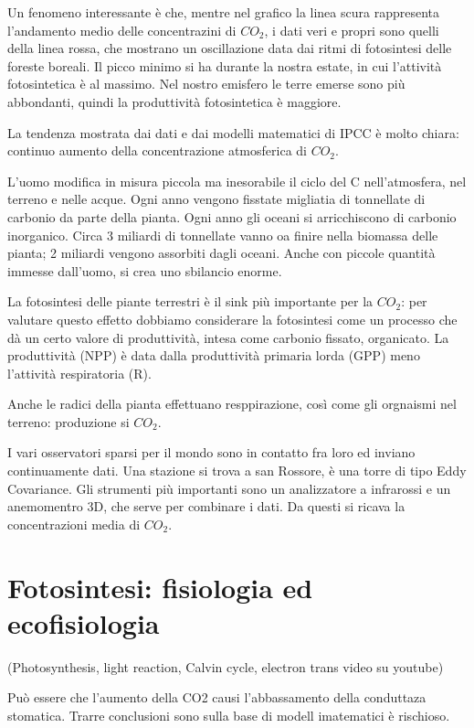 \documentclass[a4paper,12pt]{book}
\begin{document}
Un fenomeno interessante è che, mentre nel grafico la linea scura rappresenta l'andamento medio delle concentrazini di $CO_{2}$, i dati veri e propri sono quelli della linea rossa, che mostrano un oscillazione data dai ritmi di fotosintesi delle foreste boreali. Il picco minimo si ha durante la nostra estate, in cui l'attività fotosintetica è al massimo. 
Nel nostro emisfero le terre emerse sono più abbondanti, quindi la produttività fotosintetica è maggiore. 
 
La tendenza mostrata dai dati e dai modelli matematici di IPCC è molto chiara: continuo aumento della concentrazione atmosferica di $CO_{2}$.
 
L'uomo modifica in misura piccola ma inesorabile il ciclo del C nell'atmosfera, nel terreno e nelle acque. 
Ogni anno vengono fisstate migliatia di tonnellate di carbonio da parte della pianta. Ogni anno gli oceani si arricchiscono di carbonio inorganico. Circa 3 miliardi di tonnellate vanno oa finire nella biomassa delle pianta; 2 miliardi vengono assorbiti dagli oceani. Anche con piccole quantità immesse dall'uomo, si crea uno sbilancio enorme.

La fotosintesi delle piante terrestri è il sink più importante per la $CO_{2}$: per valutare questo effetto dobbiamo considerare la fotosintesi come un processo che dà un certo valore di produttività, intesa come carbonio fissato, organicato. La produttività (NPP) è data dalla produttività primaria lorda (GPP) meno l'attività respiratoria (R).

Anche le radici della pianta effettuano resppirazione, così come gli orgnaismi nel terreno: produzione si $CO_{2}$.
 
I vari osservatori sparsi per il mondo sono in contatto fra loro ed inviano continuamente dati. Una stazione si trova a san Rossore, è una torre di tipo Eddy Covariance. Gli strumenti più importanti sono un analizzatore a infrarossi e un anemomentro 3D, che serve per combinare i dati. Da questi si ricava la concentrazioni media di $CO_{2}$. 

\section{Fotosintesi: fisiologia ed ecofisiologia} 
 (Photosynthesis, light reaction, Calvin cycle, electron trans video su youtube)
 
Può essere che l'aumento della CO2 causi l'abbassamento della conduttaza stomatica. Trarre conclusioni sono sulla base di modell imatematici è rischioso.
 
\end{document}

